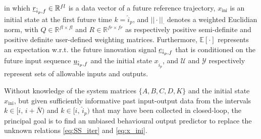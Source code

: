 in which $\underline{r}_{\hat{i}_p,f}\in\mathbb{R}^{fl}$ is a data vector of a future reference trajectory, $x_\mathrm{ini}$ is an initial state at the first future time $k=\hat{i}_p$, and $||\cdot||_\cdot$ denotes a weighted Euclidian norm, with $Q\in\mathbb{R}^{fl\times fl}$ and $R\in\mathbb{R}^{fr\times fr}$ as respectively positive semi-definite and positive definite user-defined weighting matrices. Furthermore, $\mathbb{E}[\cdot]$ represents an expectation w.r.t. the future innovation signal $\underline{e}_{\hat{i}_p,f}$ that is conditioned on the future input sequence $\underline{u}_{\hat{i}_p,f}$ and the initial state $x_{\hat{i}_p}$, and $\mathcal{U}$ and $\mathcal{Y}$ respectively represent sets of allowable inputs and outputs.

Without knowledge of the system matrices $\{A,B,C,D,K\}$ and the initial state $x_\mathrm{ini}$, but given sufficiently informative past input-output data from the intervals $k\in[i,\,i+\bar{N})$ and $k\in[\hat{i},\,\hat{i}_p)$ that may have been collected in closed-loop, the principal goal is to find an unbiased behavioural output predictor to replace the unknown relations \eqref{eq:SS_iter} and \eqref{eq:x_ini}.